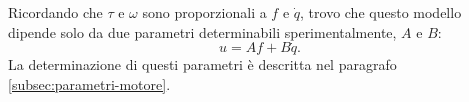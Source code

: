 Ricordando che $\tau$ e $\omega$ sono proporzionali a $f$ e $\dot q$, trovo che questo modello dipende solo da due parametri determinabili sperimentalmente, $A$ e $B$:
\begin{equation}
    u = A f + B \dot q.
    \label{eq:caratteristica-motore}
\end{equation}
La determinazione di questi parametri è descritta nel paragrafo \ref{subsec:parametri-motore}.